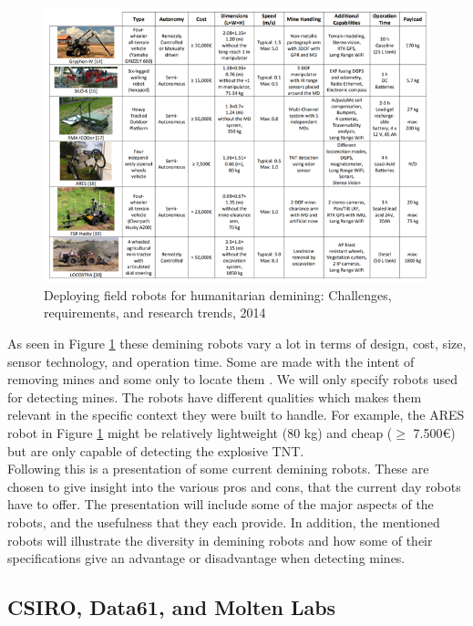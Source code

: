 \begin{figure}[ht]
  \centering
      \includegraphics[width=1\textwidth]{00 - Images/field_robots_for_humanitarian_demining_2014.png}
  \caption{Deploying field robots for humanitarian demining: Challenges, requirements, and research trends, 2014 \cite{FieldRobots2014}}
  \label{fig:field_robots_for_humanitarian_demining_2014}
\end{figure}

As seen in Figure \ref{fig:field_robots_for_humanitarian_demining_2014} these demining robots vary a lot in terms of design, cost, size, sensor technology, and operation time. Some are made with the intent of removing mines and some only to locate them \cite{FieldRobots2014}. We will only specify robots used for detecting mines. The robots have different qualities which makes them relevant in the specific context they were built to handle. For example, the ARES robot in Figure \ref{fig:field_robots_for_humanitarian_demining_2014} might be relatively lightweight (80 kg) and cheap ($\ge$ 7.500€) but are only capable of detecting the explosive TNT.\\

Following this is a presentation of some current demining robots. These are chosen to give insight into the various pros and cons, that the current day robots have to offer. The presentation will include some of the major aspects of the robots, and the usefulness that they each provide. In addition, the mentioned robots will illustrate the diversity in demining robots and how some of their specifications give an advantage or disadvantage when detecting mines.

\subsection{CSIRO, Data61, and Molten Labs}

